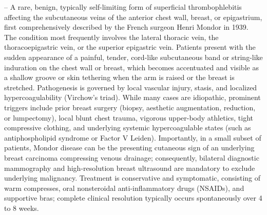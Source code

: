 -- A rare, benign, typically self-limiting form of superficial thrombophlebitis affecting the subcutaneous veins of the anterior chest wall, breast, or epigastrium, first comprehensively described by the French surgeon Henri Mondor in 1939. The condition most frequently involves the lateral thoracic vein, the thoracoepigastric vein, or the superior epigastric vein. Patients present with the sudden appearance of a painful, tender, cord-like subcutaneous band or string-like induration on the chest wall or breast, which becomes accentuated and visible as a shallow groove or skin tethering when the arm is raised or the breast is stretched. Pathogenesis is governed by local vascular injury, stasis, and localized hypercoagulability (Virchow's triad). While many cases are idiopathic, prominent triggers include prior breast surgery (biopsy, aesthetic augmentation, reduction, or lumpectomy), local blunt chest trauma, vigorous upper-body athletics, tight compressive clothing, and underlying systemic hypercoagulable states (such as antiphospholipid syndrome or Factor V Leiden). Importantly, in a small subset of patients, Mondor disease can be the presenting cutaneous sign of an underlying breast carcinoma compressing venous drainage; consequently, bilateral diagnostic mammography and high-resolution breast ultrasound are mandatory to exclude underlying malignancy. Treatment is conservative and symptomatic, consisting of warm compresses, oral nonsteroidal anti-inflammatory drugs (NSAIDs), and supportive bras; complete clinical resolution typically occurs spontaneously over 4 to 8 weeks.

